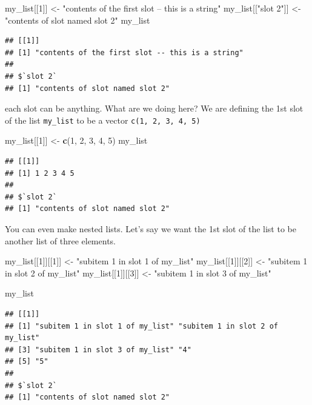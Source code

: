 \documentclass[
]{book}
\newenvironment{Shaded}{\begin{snugshade}}{\end{snugshade}}
\newcommand{\DecValTok}[1]{\textcolor[rgb]{0.00,0.00,0.81}{#1}}
\newcommand{\KeywordTok}[1]{\textcolor[rgb]{0.13,0.29,0.53}{\textbf{#1}}}
\newcommand{\NormalTok}[1]{#1}
\newcommand{\StringTok}[1]{\textcolor[rgb]{0.31,0.60,0.02}{#1}}
\theoremstyle{definition}
\theoremstyle{definition}
\theoremstyle{definition}
\theoremstyle{definition}
\theoremstyle{remark}
\begin{document}
\begin{Shaded}
\begin{Highlighting}[]
\NormalTok{my_list[[}\DecValTok{1}\NormalTok{]] <-}\StringTok{ "contents of the first slot -- this is a string"}
\NormalTok{my_list[[}\StringTok{"slot 2"}\NormalTok{]] <-}\StringTok{ "contents of slot named slot 2"}
\NormalTok{my_list}
\end{Highlighting}
\end{Shaded}

\begin{verbatim}
## [[1]]
## [1] "contents of the first slot -- this is a string"
## 
## $`slot 2`
## [1] "contents of slot named slot 2"
\end{verbatim}

each slot can be anything. What are we doing here? We are defining the 1st slot of the list \texttt{my\_list} to be a vector \texttt{c(1,\ 2,\ 3,\ 4,\ 5)}

\begin{Shaded}
\begin{Highlighting}[]
\NormalTok{my_list[[}\DecValTok{1}\NormalTok{]] <-}\StringTok{ }\KeywordTok{c}\NormalTok{(}\DecValTok{1}\NormalTok{, }\DecValTok{2}\NormalTok{, }\DecValTok{3}\NormalTok{, }\DecValTok{4}\NormalTok{, }\DecValTok{5}\NormalTok{)}
\NormalTok{my_list}
\end{Highlighting}
\end{Shaded}

\begin{verbatim}
## [[1]]
## [1] 1 2 3 4 5
## 
## $`slot 2`
## [1] "contents of slot named slot 2"
\end{verbatim}

You can even make nested lists. Let's say we want the 1st slot of the list to be another list of three elements.

\begin{Shaded}
\begin{Highlighting}[]
\NormalTok{my_list[[}\DecValTok{1}\NormalTok{]][[}\DecValTok{1}\NormalTok{]] <-}\StringTok{ "subitem 1 in slot 1 of my_list"}
\NormalTok{my_list[[}\DecValTok{1}\NormalTok{]][[}\DecValTok{2}\NormalTok{]] <-}\StringTok{ "subitem 1 in slot 2 of my_list"}
\NormalTok{my_list[[}\DecValTok{1}\NormalTok{]][[}\DecValTok{3}\NormalTok{]] <-}\StringTok{ "subitem 1 in slot 3 of my_list"}

\NormalTok{my_list}
\end{Highlighting}
\end{Shaded}

\begin{verbatim}
## [[1]]
## [1] "subitem 1 in slot 1 of my_list" "subitem 1 in slot 2 of my_list"
## [3] "subitem 1 in slot 3 of my_list" "4"                             
## [5] "5"                             
## 
## $`slot 2`
## [1] "contents of slot named slot 2"
\end{verbatim}
\end{document}
